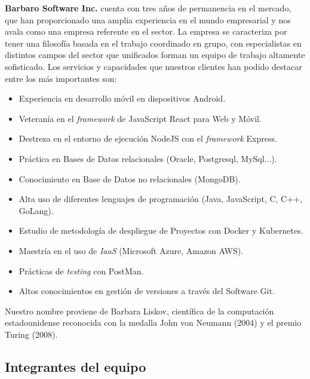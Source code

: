 \documentclass{article}
\begin{document}
\textbf{Barbaro Software Inc.} cuenta con tres años de permanencia en el mercado, que han proporcionado una amplia experiencia en el mundo empresarial y nos avala como una empresa referente en el sector. La empresa se caracteriza por tener una filosofía basada en el trabajo coordinado en grupo, con especialistas en distintos campos del sector que unificados forman un equipo de trabajo altamente sofisticado.
Los servicios y capacidades que nuestros clientes han podido destacar entre los más importantes son:
\begin{itemize}
    \setlength\itemsep{0em}
    \item Experiencia en desarrollo móvil en dispositivos Android.
    \item Veteranía en el \textit{framework} de JavaScript React para Web y Móvil.
    \item Destreza en el entorno de ejecución NodeJS con el \textit{framework} Express.
    \item Práctica en Bases de Datos relacionales (Oracle, Postgresql, MySql...).
    \item Conocimiento en Base de Datos no relacionales (MongoDB).
    \item Alta uso de diferentes lenguajes de programación (Java, JavaScript, C, C++, GoLang).
    \item Estudio de metodología de despliegue de Proyectos con Docker y Kubernetes.
    \item Maestría en el uso de \textit{IaaS} (Microsoft Azure, Amazon AWS).
    \item Prácticas de \textit{testing} con PostMan.
    \item Altos conocimientos en gestión de versiones a través del Software Git.
\end{itemize}

Nuestro nombre proviene de Barbara Liskov, científica de la computación estadounidense reconocida con la medalla John von Neumann (2004) y el premio Turing (2008).

\pagebreak

\subsection*{Integrantes del equipo}
\end{document}
